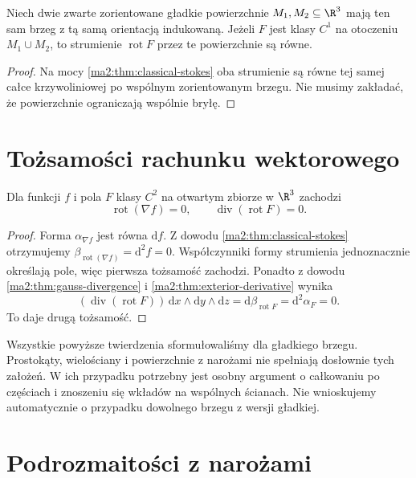 \begin{wniosek}
\label{ma2:cor:stokes-surface-independence}
Niech dwie zwarte zorientowane gładkie powierzchnie
$M_1,M_2\subseteq\R^3$ mają ten sam brzeg
z tą samą orientacją indukowaną.
Jeżeli $F$ jest klasy $C^1$ na otoczeniu
$M_1\cup M_2$, to strumienie $\operatorname{rot}F$
przez te powierzchnie są równe.
\end{wniosek}
\begin{proof}
Na mocy \ref{ma2:thm:classical-stokes} oba
strumienie są równe tej samej całce krzywoliniowej
po wspólnym zorientowanym brzegu.
Nie musimy zakładać, że powierzchnie ograniczają
wspólnie bryłę.
\end{proof}

\section{Tożsamości rachunku wektorowego}

\begin{stwierdzenie}
\label{ma2:prop:vector-identities-d2}
Dla funkcji $f$ i pola $F$ klasy $C^2$
na otwartym zbiorze w $\R^3$ zachodzi
\[
 \operatorname{rot}(\nabla f)=0,\qquad
 \operatorname{div}(\operatorname{rot}F)=0.
\]
\end{stwierdzenie}
\begin{proof}
Forma $\alpha_{\nabla f}$ jest równa $\mathrm df$.
Z dowodu \ref{ma2:thm:classical-stokes}
otrzymujemy
$\beta_{\operatorname{rot}(\nabla f)}=\mathrm d^2f=0$.
Współczynniki formy strumienia jednoznacznie
określają pole, więc pierwsza tożsamość zachodzi.
Ponadto z dowodu \ref{ma2:thm:gauss-divergence}
i \ref{ma2:thm:exterior-derivative} wynika
\[
 (\operatorname{div}(\operatorname{rot}F))\,
 \mathrm dx\wedge\mathrm dy\wedge\mathrm dz
 =\mathrm d\beta_{\operatorname{rot}F}
 =\mathrm d^2\alpha_F=0.
\]
To daje drugą tożsamość.
\end{proof}

Wszystkie powyższe twierdzenia sformułowaliśmy
dla gładkiego brzegu. Prostokąty, wielościany
i powierzchnie z narożami nie spełniają dosłownie
tych założeń. W ich przypadku potrzebny jest
osobny argument o całkowaniu po częściach
i znoszeniu się wkładów na wspólnych ścianach.
Nie wnioskujemy automatycznie o przypadku
dowolnego brzegu z wersji gładkiej.

\section{Podrozmaitości z narożami}

